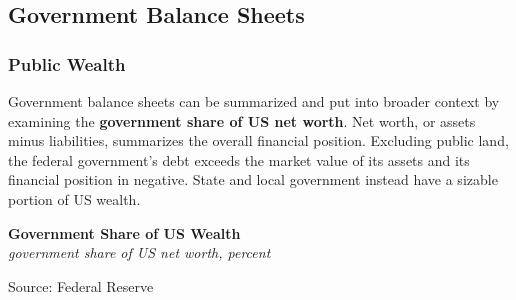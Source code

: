 \documentclass{report}
\makeatletter
\newcommand{\tbllink}[1]{\href{https://raw.githubusercontent.com/bdecon/US-chartbook/master/chartbook/data/#1}{\faTable}}
\newcommand*\short[1]{\expandafter\@gobbletwo\number\numexpr#1\relax}
\newcommand{\absnode}[3]{\node[below right, align=left] at (axis cs: #1,#2) {#3};}
\newcommand{\dateaxisticks}{
		date coordinates in=x, axis line style={draw=none},
		xmax={2023-10-01},
		max space between ticks=40,	    
		xtick={{1990-01-01}, {1992-01-01}, {1994-01-01}, 
			{1996-01-01}, {1998-01-01}, {2000-01-01}, 
			{2002-01-01}, {2004-01-01}, {2006-01-01},
			{2008-01-01}, {2010-01-01}, {2012-01-01}, {2014-01-01},
		    {2016-01-01}, {2018-01-01}, {2020-01-01}, {2022-01-01}, 
		    {2024-01-01}, {2026-01-01}},
		minor xtick={{1989-01-01}, {1991-01-01}, {1993-01-01},
			{1995-01-01}, {1997-01-01}, {1999-01-01}, 
			{2001-01-01}, {2003-01-01}, {2005-01-01}, {2007-01-01},
		    {2009-01-01}, {2011-01-01}, {2013-01-01}, {2015-01-01},
		    {2017-01-01}, {2019-01-01}, {2021-01-01}, {2023-01-01}, 
		    {2025-01-01}, {2027-01-01}},
		enlarge y limits={0.06}, enlarge x limits={0.01},
		}
\newcommand{\bbar}[2]{extra #1 ticks = {{#2}}, extra #1 tick labels = ,
		extra #1 tick style = {grid=major, grid style={thick, black!25}},}
\newcommand{\thickline}[4]{\addplot[ultra thick, no markers, color=#1] 
		table [x=#2, y=#3, col sep=comma] {#4};	}
\newcommand{\rbars}{
		\fill[color=black!10] (axis cs:{1990-07-01},\pgfkeysvalueof{/pgfplots/ymin}) rectangle 
			(axis cs:{1991-03-01}, \pgfkeysvalueof{/pgfplots/ymax});
		\fill[color=black!10] (axis cs:{2007-12-01},\pgfkeysvalueof{/pgfplots/ymin}) rectangle 
			(axis cs:{2009-07-01}, \pgfkeysvalueof{/pgfplots/ymax});
		\fill[color=black!10] (axis cs:{2001-03-01},\pgfkeysvalueof{/pgfplots/ymin}) rectangle 
			(axis cs:{2001-11-01}, \pgfkeysvalueof{/pgfplots/ymax});
		\fill[color=black!10] (axis cs:{2020-02-01},\pgfkeysvalueof{/pgfplots/ymin}) rectangle 
			(axis cs:{2020-05-01}, \pgfkeysvalueof{/pgfplots/ymax});}
\makeatother
\begin{document}
{\begin{minipage}{0.76\textwidth}
\subsection*{Government Balance Sheets}   

\subsubsection*{Public Wealth}
\hypertarget{govbs}{\label{govbs}}
\small Government balance sheets can be summarized and put into broader context by examining the \textbf{government share of US net worth}. Net worth, or assets minus liabilities, summarizes the overall financial position. Excluding public land, the federal government's debt exceeds the market value of its assets and its financial position in negative. State and local government instead have a sizable portion of US wealth. 


\vspace{2mm}

\normalsize \textbf{Government Share of US Wealth}\\
\footnotesize{\textit{government share of US net worth, percent}}
\vspace{4.2cm}

\hspace{6mm} 

\footnotesize{Source: Federal Reserve} \hfill \tbllink{govshnw.csv}
\end{minipage}
\newpage
\begin{minipage}{0.76\textwidth}   

\end{minipage}}
\end{document}
